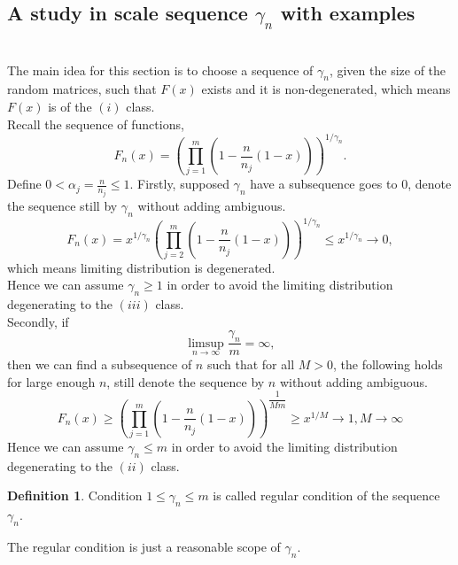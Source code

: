 \documentclass[12pt]{article}
\theoremstyle{plain}
\theoremstyle{definition}
\newtheorem{dfn}{\textbf{Definition}}
\theoremstyle{remark}
\begin{document}
\subsection{A study in scale sequence $\gamma_n$ with examples}\ \\
The main idea for this section is to choose a sequence of $\gamma_{n}$, given the size of the random matrices, such that $F(x)$ exists and it is non-degenerated, which means $F(x)$ is of the $(i)$ class.\\
Recall the sequence of functions,
\begin{equation*}
	F_{n}(x)=\left(\prod_{j=1}^{m}\left(1-\frac{n}{n_{j}}(1-x)\right)\right)^{1 / \gamma_{n}}.
\end{equation*}
Define $0<\alpha _j =\frac{n}{n_j}\leq 1$.
Firstly, supposed $\gamma_{n}$ have a subsequence goes to $0$, denote the sequence still by  $\gamma_{n}$ without adding ambiguous.
\begin{equation*}
	F_n(x)=x^{1 / \gamma_{n}} \left(\prod_{j=2}^{m}\left(1-\frac{n}{n_{j}}(1-x)\right)\right)^{1 / \gamma_{n}}\leq x^{1 / \gamma_{n}} \rightarrow 0,
\end{equation*}
which means limiting distribution is degenerated.\\
Hence we can assume $\gamma_{n}\geq 1$ in order to avoid the limiting distribution degenerating to the $(iii)$ class.\\
Secondly, if 
\begin{equation*}
	\limsup _{n \rightarrow \infty}\dfrac{\gamma_{n}}{m}=\infty ,
\end{equation*}
then we can find a subsequence of $n$ such that for all $M>0$, the following holds for large enough $n$, still denote the sequence by  ${n}$ without adding ambiguous.
\begin{equation}
F_n(x)\geq\left(\prod_{j=1}^{m}\left(1-\frac{n}{n_{j}}(1-x)\right)\right)^{\dfrac{1}{Mm}}\geq x^{1 / M}\rightarrow 1, M\rightarrow \infty
\end{equation}
Hence we can assume $\gamma_{n}\leq m$ in order to avoid the limiting distribution degenerating to the $(ii)$ class.
\begin{dfn}
	Condition $1\leq \gamma_{n} \leq m$ is called regular condition of the sequence $\gamma_{n}$.
\end{dfn}
The regular condition is just a reasonable scope of $\gamma_{n}$. \\
\end{document}
